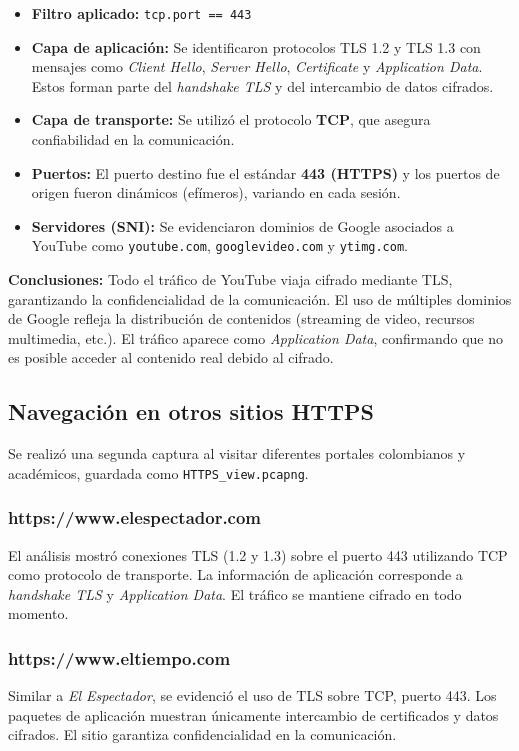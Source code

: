 \documentclass[10pt]{article}
\begin{document}
\begin{itemize}
    \item \textbf{Filtro aplicado:} \texttt{tcp.port == 443}
    \item \textbf{Capa de aplicación:} Se identificaron protocolos TLS 1.2 y TLS 1.3 con mensajes como \textit{Client Hello}, \textit{Server Hello}, \textit{Certificate} y \textit{Application Data}. Estos forman parte del \textit{handshake TLS} y del intercambio de datos cifrados.
    \item \textbf{Capa de transporte:} Se utilizó el protocolo \textbf{TCP}, que asegura confiabilidad en la comunicación.
    \item \textbf{Puertos:} El puerto destino fue el estándar \textbf{443 (HTTPS)} y los puertos de origen fueron dinámicos (efímeros), variando en cada sesión.
    \item \textbf{Servidores (SNI):} Se evidenciaron dominios de Google asociados a YouTube como \texttt{youtube.com}, \texttt{googlevideo.com} y \texttt{ytimg.com}.
\end{itemize}

\noindent
\textbf{Conclusiones:} Todo el tráfico de YouTube viaja cifrado mediante TLS, garantizando la confidencialidad de la comunicación. 
El uso de múltiples dominios de Google refleja la distribución de contenidos (streaming de video, recursos multimedia, etc.). 
El tráfico aparece como \textit{Application Data}, confirmando que no es posible acceder al contenido real debido al cifrado.


\subsection{Navegación en otros sitios HTTPS}
Se realizó una segunda captura al visitar diferentes portales colombianos y académicos, guardada como \texttt{HTTPS\_view.pcapng}.

\subsubsection{https://www.elespectador.com}
El análisis mostró conexiones TLS (1.2 y 1.3) sobre el puerto 443 utilizando TCP como protocolo de transporte. 
La información de aplicación corresponde a \textit{handshake TLS} y \textit{Application Data}. 
El tráfico se mantiene cifrado en todo momento.

\subsubsection{https://www.eltiempo.com}
Similar a \textit{El Espectador}, se evidenció el uso de TLS sobre TCP, puerto 443. 
Los paquetes de aplicación muestran únicamente intercambio de certificados y datos cifrados. 
El sitio garantiza confidencialidad en la comunicación.
\end{document}
